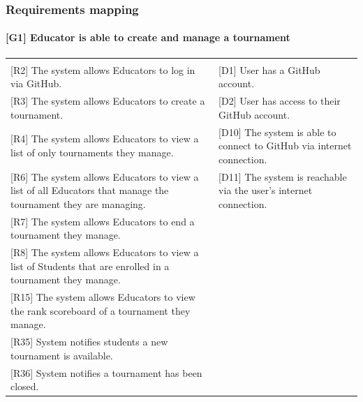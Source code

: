 \documentclass{article}
\begin{document}
\subsubsection{Requirements mapping}

\paragraph{[G1] Educator is able to create and manage a tournament}
\begin{center}
\begin{tabular}{|m{20em}|m{20em}|}
\hline
& \\
{[R2]} The system allows Educators to log in via GitHub. &
{[D1]} User has a GitHub account.\\
{[R3]} The system allows Educators to create a tournament. &
{[D2]} User has access to their GitHub account.\\
{[R4]} The system allows Educators to view a list of only tournaments they manage. &
[D10] The system is able to connect to GitHub via internet connection.\\
{[R6]} The system allows Educators to view a list of all Educators that manage the tournament they are managing. &
[D11] The system is reachable via the user’s internet connection.\\
{[R7]} The system allows Educators to end a tournament they manage. & \\
{[R8]} The system allows Educators to view a list of Students that are enrolled in a tournament they manage. & \\
{[R15]} The system allows Educators to view the rank scoreboard of a tournament they manage. & \\
{[R35]} System notifies students a new tournament is available.  & \\
{[R36]} System notifies a tournament has been closed. & \\
\hline
\end{tabular}
\end{center}
\end{document}
